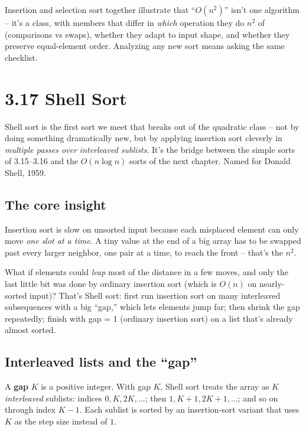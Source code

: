 \documentclass[11pt]{article}
\begin{document}
\begin{notebox}
Insertion and selection sort together illustrate that ``$O(n^2)$''
isn't one algorithm -- it's a class, with members that differ in
\emph{which} operation they do $n^2$ of (comparisons vs swaps),
whether they adapt to input shape, and whether they preserve
equal-element order. Analyzing any new sort means asking the same
checklist.
\end{notebox}

\section{3.17 Shell Sort}

Shell sort is the first sort we meet that breaks out of the
quadratic class -- not by doing something dramatically new, but by
applying insertion sort cleverly in \emph{multiple passes over
interleaved sublists}. It's the bridge between the simple sorts of
3.15--3.16 and the $O(n \log n)$ sorts of the next chapter. Named
for Donald Shell, 1959.

\subsection{The core insight}

Insertion sort is slow on unsorted input because each misplaced
element can only move \emph{one slot at a time}. A tiny value at the
end of a big array has to be swapped past every larger neighbor,
one pair at a time, to reach the front -- that's the $n^2$.

\begin{ideabox}
What if elements could \emph{leap} most of the distance in a few
moves, and only the last little bit was done by ordinary insertion
sort (which is $O(n)$ on nearly-sorted input)? That's Shell sort:
first run insertion sort on many interleaved subsequences with a
big ``gap,'' which lets elements jump far; then shrink the gap
repeatedly; finish with gap = 1 (ordinary insertion sort) on a list
that's already almost sorted.
\end{ideabox}

\subsection{Interleaved lists and the ``gap''}

\begin{defnbox}[Gap]
A \textbf{gap} $K$ is a positive integer. With gap $K$, Shell sort
treats the array as $K$ \emph{interleaved} sublists: indices $0, K,
2K, \ldots$; then $1, K+1, 2K+1, \ldots$; and so on through index
$K-1$. Each sublist is sorted by an insertion-sort variant that
uses $K$ as the step size instead of $1$.
\end{defnbox}
\end{document}
